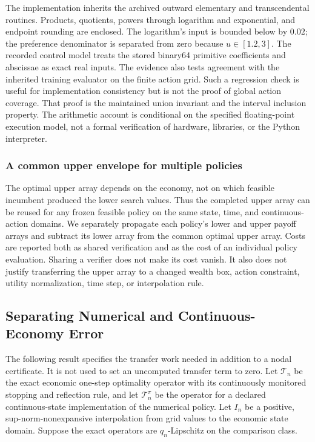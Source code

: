 The implementation inherits the archived outward elementary and transcendental routines. Products, quotients, powers through logarithm and exponential, and endpoint rounding are enclosed. The logarithm's input is bounded below by $0.02$; the preference denominator is separated from zero because $u\in[1.2,3]$. The recorded control model treats the stored binary64 primitive coefficients and abscissae as exact real inputs. The evidence also tests agreement with the inherited training evaluator on the finite action grid. Such a regression check is useful for implementation consistency but is not the proof of global action coverage. That proof is the maintained union invariant and the interval inclusion property. The arithmetic account is conditional on the specified floating-point execution model, not a formal verification of hardware, libraries, or the Python interpreter.

\subsubsection{A common upper envelope for multiple policies}
The optimal upper array depends on the economy, not on which feasible incumbent produced the lower search values. Thus the completed upper array can be reused for any frozen feasible policy on the same state, time, and continuous-action domains. We separately propagate each policy's lower and upper payoff arrays and subtract its lower array from the common optimal upper array. Costs are reported both as shared verification and as the cost of an individual policy evaluation. Sharing a verifier does not make its cost vanish. It also does not justify transferring the upper array to a changed wealth box, action constraint, utility normalization, time step, or interpolation rule.

\subsection{Separating Numerical and Continuous-Economy Error}\label{supp:r8-transfer}
The following result specifies the transfer work needed in addition to a nodal certificate. It is not used to set an uncomputed transfer term to zero. Let $\mathcal T_n$ be the exact economic one-step optimality operator with its continuously monitored stopping and reflection rule, and let $\mathcal T_n^{\pi}$ be the operator for a declared continuous-state implementation of the numerical policy. Let $I_n$ be a positive, sup-norm-nonexpansive interpolation from grid values to the economic state domain. Suppose the exact operators are $q_n$-Lipschitz on the comparison class.


